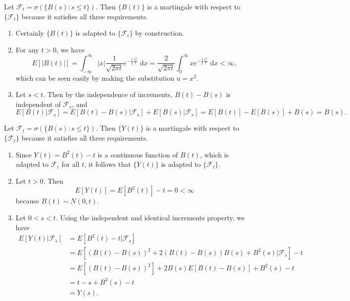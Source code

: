 \documentclass{homework}
\newcommand{\fil}{\mathcal{F}}
\begin{document}
	Let $\fil_t = \sigma(\{B(s) : s\le t\})$. Then $\{B(t)\}$ is a martingale with respect to $\{\fil_t\}$ because it satisfies all three requirements.
	\begin{enumerate}
		\item Certainly $\{B(t)\}$ is adapted to $\{\fil_t\}$ by construction.
		\item For any $t > 0$, we have
		\begin{equation*}
			E[|B(t)|] = \int_{-\infty}^\infty |x| \frac{1}{\sqrt{2\pi t}}e^{-\frac{1}{2}\frac{x^2}{t}}\;\text{d}x = \frac{2}{\sqrt{2\pi t}}\int_0^\infty xe^{-\frac{1}{2}\frac{x^2}{t}}\;\text{d}x< \infty,
		\end{equation*}
		which can be seen easily by making the substitution $u = x^2$.
		\item Let $s < t$. Then by the independence of increments, $B(t) - B(s)$ is independent of $\fil_s$, and
		\begin{equation*}
			E[B(t) | \fil_s] = E[B(t) - B(s)|\fil_s] + E[B(s)|\fil_s] = E[B(t)] - E[B(s)] + B(s) = B(s).
		\end{equation*}
	\end{enumerate}
	
	Let $\fil_t = \sigma(\{B(s) : s \le t\})$. Then $\{Y(t)\}$ is a martingale with respect to $\{\fil_t\}$ because it satisfies all three requirements.
	\begin{enumerate}
		\item Since $Y(t) = B^2(t) - t$ is a continuous function of $B(t)$, which is adapted to $\fil_t$ for all $t$, it follows that $\{Y(t)\}$ is adapted to $\{\fil_t\}$.
		\item Let $t > 0$. Then
		\begin{equation*}
			E[Y(t)] = E[B^2(t)] - t = 0 < \infty
		\end{equation*}
		because $B(t) \sim N(0,t)$.
		\item Let $0 < s<t$. Using the independent and identical increments property, we have
		\begin{align*}
			E[Y(t)|\fil_s] &= E[B^2(t) - t|\fil_s] \\
			&=E[(B(t) - B(s))^2 + 2(B(t) - B(s))B(s) + B^2(s)|\fil_s] - t \\
			&= E[(B(t) - B(s))^2] + 2B(s)E[B(t)-B(s)] + B^2(s) - t \\
			&= t-s + B^2(s) - t \\
			&= Y(s).
		\end{align*}
	\end{enumerate}
\end{document}
